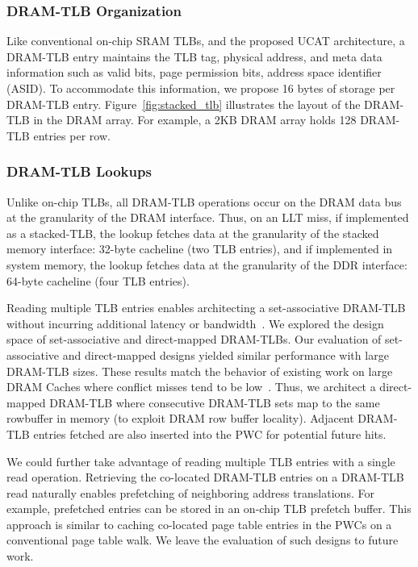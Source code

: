 
\subsubsection{DRAM-TLB Organization}

\noindent Like conventional on-chip SRAM TLBs, and the proposed UCAT
architecture, a DRAM-TLB entry maintains the TLB tag, physical
address, and meta data information such as valid bits, page permission
bits, address space identifier (ASID). To accommodate this
information, we propose 16 bytes of storage per DRAM-TLB entry.
Figure~\ref{fig:stacked_tlb} illustrates the layout of the DRAM-TLB in
the DRAM array. For example, a 2KB DRAM array holds 128 DRAM-TLB
entries per row.

\subsubsection{DRAM-TLB Lookups}

\noindent Unlike on-chip TLBs, all DRAM-TLB operations occur on the
DRAM data bus at the granularity of the DRAM interface. Thus, on an
LLT miss, if implemented as a stacked-TLB, the lookup fetches data at
the granularity of the stacked memory interface: 32-byte cacheline
(two TLB entries), and if implemented in system memory, the lookup
fetches data at the granularity of the DDR interface: 64-byte
cacheline (four TLB entries).

Reading multiple TLB entries enables architecting a set-associative
DRAM-TLB without incurring additional latency or
bandwidth~\cite{moin2012,loh2011}. We explored the design space of
set-associative and direct-mapped DRAM-TLBs. Our evaluation of
set-associative and direct-mapped designs yielded similar performance
with large DRAM-TLB sizes. These results match the behavior of
existing work on large DRAM Caches where conflict misses tend to be
low~\cite{moin2012}. Thus, we architect a direct-mapped DRAM-TLB where
consecutive DRAM-TLB sets map to the same rowbuffer in memory (to
exploit DRAM row buffer locality). Adjacent DRAM-TLB entries fetched
are also inserted into the PWC for potential future hits.

We could further take advantage of reading multiple TLB entries with a
single read operation. Retrieving the co-located DRAM-TLB entries on a
DRAM-TLB read naturally enables prefetching of neighboring address
translations. For example, prefetched entries can be stored in an
on-chip TLB prefetch buffer. This approach is similar to caching
co-located page table entries in the PWCs on a conventional page table
walk. We leave the evaluation of such designs to future work.


